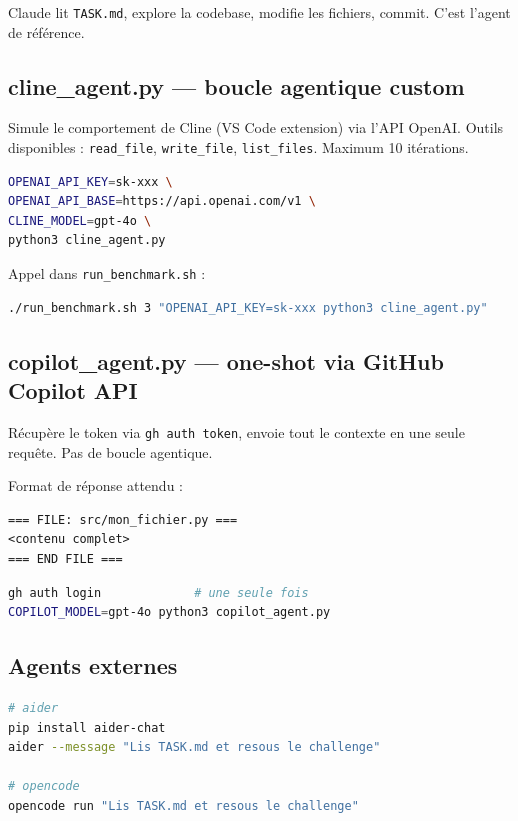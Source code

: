 \documentclass[11pt,a4paper]{article}
\newcommand{\code}[1]{\texttt{#1}}
\begin{document}
Claude lit \code{TASK.md}, explore la codebase, modifie les fichiers, commit.
C'est l'agent de référence.

\subsection{cline\_agent.py — boucle agentique custom}

Simule le comportement de Cline (VS Code extension) via l'API OpenAI.
Outils disponibles : \code{read\_file}, \code{write\_file}, \code{list\_files}.
Maximum 10 itérations.

\begin{lstlisting}[language=bash]
OPENAI_API_KEY=sk-xxx \
OPENAI_API_BASE=https://api.openai.com/v1 \
CLINE_MODEL=gpt-4o \
python3 cline_agent.py
\end{lstlisting}

Appel dans \code{run\_benchmark.sh} :
\begin{lstlisting}[language=bash]
./run_benchmark.sh 3 "OPENAI_API_KEY=sk-xxx python3 cline_agent.py"
\end{lstlisting}

\subsection{copilot\_agent.py — one-shot via GitHub Copilot API}

Récupère le token via \code{gh auth token}, envoie tout le contexte en une
seule requête. Pas de boucle agentique.

Format de réponse attendu :
\begin{lstlisting}
=== FILE: src/mon_fichier.py ===
<contenu complet>
=== END FILE ===
\end{lstlisting}

\begin{lstlisting}[language=bash]
gh auth login             # une seule fois
COPILOT_MODEL=gpt-4o python3 copilot_agent.py
\end{lstlisting}

\subsection{Agents externes}

\begin{lstlisting}[language=bash]
# aider
pip install aider-chat
aider --message "Lis TASK.md et resous le challenge"

# opencode
opencode run "Lis TASK.md et resous le challenge"
\end{lstlisting}
\end{document}

